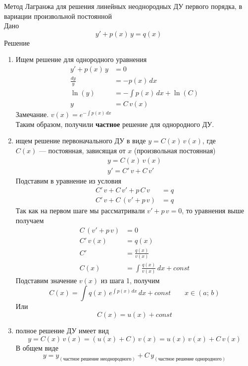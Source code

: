 \begin{Note}
Метод Лагранжа для решения линейных неоднородных ДУ первого порядка, в вариации произвольной постоянной\\
Дано
\[
    y'+p(x)\,y=q(x)
\]
Решение
    \begin{enumerate}
        \item Ищем решение для однородного уравнения
        \begin{align*}
            y'+p(x)\,y&=0\\
            \frac{dy}{y}&=-p(x)\,dx\\
            \ln(y)&=-\int p(x)\,dx+\ln(C)\\
            y&= C\,v(x)
        \end{align*}
        Замечание. $v(x)=e^{-\int p(x)\,dx}$\\
        Таким образом, получили \textbf{частное} решение для однородного ДУ.
    
        \item ищем решение первоначального ДУ в виде $y=C(x)\,v(x)$, где\\ $C(x)$ --- постоянная, зависящая от $x$ (произвольная постоянная)
        \begin{align*}
            y = C(x)\,v(x)\\
            y'=C'\,v + C\,v'
        \end{align*}
        Подставим в уравнение из условия
        \begin{align*}  
            C'\,v+C\,v'+p\,C\,v&=q\\ 
            C'\,v+C\,(v'+p\,v)&=q
        \end{align*}
        Так как на первом шаге мы рассматривали $v'+p\,v = 0$, то уравнения выше получаем
        \begin{align*}
            C\,(v'+p\,v)&=0\\
            C'\,v(x) &= q(x)\\
            C'&=\frac{q(x)}{v(x)}\\
            C(x)&=\int \frac{q(x)}{v(x)}\,dx+const
        \end{align*}
        Подставим значение $v(x)$ из шага 1, получим
        \[
            C(x) = \int q(x)\,e^{\int p(x)\,dx}\,dx+const \qquad x \in (a;\,b)
        \]
        Или
        \[
            C(x) = u(x) + const
        \]
        \item полное решение ДУ имеет вид
        \[
            y= C(x)\,v(x) = (u(x) + C)\,v(x)=u(x)\,v(x)+C\,v(x)
        \]
        В общем виде
        \[
            y=y_{(\text{частное решение неоднородного})} + C\,y_{(\text{частное решение однородного})}
        \]
    \end{enumerate}
\end{Note}

